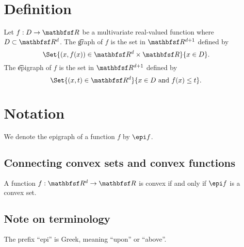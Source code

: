
\section*{Definition}

Let $f: D \to \R $ be a multivariate real-valued function where $D \subset \R ^d$.
The \t{graph} of $f$ is the set in $\R ^{d + 1}$ defined by
\[
\Set{(x, f(x)) \in \R ^d \times  \R }{x \in D}.
\]
The \t{epigraph} of $f$ is the set in $\R ^{d + 1}$ defined by
\[
\Set{(x, t) \in \R ^{d}}{x \in D \text{ and } f(x) \leq t}.
\]

\section*{Notation}

We denote the epigraph of a function $f$ by $\epi f$.



\subsection*{Connecting convex sets and convex functions}

A function $f: \R ^d \to \R $ is convex if and only if $\epi f$ is a convex set.
\subsection*{Note on terminology}

The prefix ``epi'' is Greek, meaning ``upon'' or ``above''.

\blankpage
